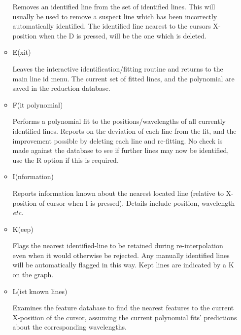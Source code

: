 \begin{itemize}
\begin{itemize}
            Removes an identified line from
            the set of identified lines. This will usually be used to
            remove a suspect line which has been incorrectly automatically
            identified. The identified line nearest to the cursors
            X-position when the D is pressed,  will be the one which is
            deleted.

      \item {\sunspec{\Large\tt}{\bf} E}(xit)

            Leaves the interactive
            identification/fitting routine and returns to the main line id
            menu. The current set of fitted lines,  and the polynomial are
            saved in the reduction database.

      \item {\sunspec{\Large\tt}{\bf} F}(it polynomial)

            Performs a polynomial fit to
            the positions/wavelengths of all currently identified lines.
            Reports on the deviation of each line from the fit,  and the
            improvement possible by deleting each line and re-fitting. No
            check is made against the database to see if further lines may
            now be identified, use the R option if this is required.

      \item {\sunspec{\Large\tt}{\bf} I}(nformation)

            Reports information known about
            the nearest located line (relative to X-position of cursor when
            I is pressed). Details include position, wavelength {\it etc.}

      \item {\sunspec{\Large\tt}{\bf} K}(eep)

            Flags the nearest identified-line to
            be retained during re-interpolation even when it
            would otherwise be rejected. Any manually identified lines will
            be automatically flagged in this way. Kept lines are indicated
            by a K on the graph.

      \item {\sunspec{\Large\tt}{\bf} L}(ist known lines)

            Examines the feature database
            to find the nearest features to the current X-position of the
            cursor,  assuming the current polynomial fits' predictions
            about the corresponding wavelengths.


\end{itemize}
\end{itemize}
